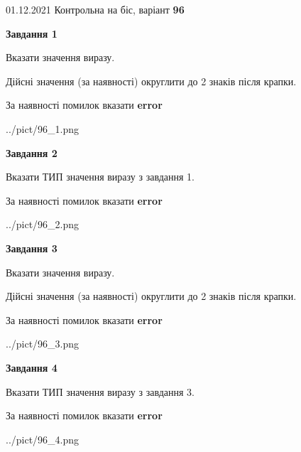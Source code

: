 \documentclass[11pt, ukrainian]{article}
\begin{document}
{01.12.2021 Контрольна на біс, варіант  \No \textbf { 96 }\par}
{
\begin {large}
{\begin {center}\textbf{Завдання 1}\end {center}}\par
Вказати значення виразу. \par
Дійсні значення (за наявності) округлити до 2 знаків після крапки. \par
За наявності помилок вказати \textbf{error}

\begin{center}
	{../pict/96_1.png}
\end{center}
\newpage

{\begin {center}\textbf{Завдання 2}\end {center}}\par
Вказати ТИП значення виразу з завдання 1. \par
За наявності помилок вказати \textbf{error}

\begin{center}
	{../pict/96_2.png}
\end{center}
\newpage

{\begin {center}\textbf{Завдання 3}\end {center}}\par
Вказати значення виразу. \par
Дійсні значення (за наявності) округлити до 2 знаків після крапки. \par
За наявності помилок вказати \textbf{error}

\begin{center}
	{../pict/96_3.png}
\end{center}
\newpage

{\begin {center}\textbf{Завдання 4}\end {center}}\par
Вказати ТИП значення виразу з завдання 3. \par
За наявності помилок вказати \textbf{error}

\begin{center}
	{../pict/96_4.png}
\end{center}
\newpage


\end{large}}
\end{document}
